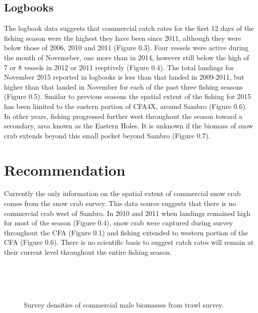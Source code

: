 \documentclass[paper=a4, fontsize=11pt]{article}
\newcommand{\D}{.}
\numberwithin{equation}{section}
\numberwithin{figure}{section}
\numberwithin{table}{section}
\begin{document}
\subsection{Logbooks}
The logbook data suggests that commercial catch rates for the first 12 days of the fishing season were the highest they have been since 2011, although they were below those of 2006, 2010 and 2011 (Figure 0.3). Four vessels were active during the month of Novemeber, one more than in 2014, however still below the high of 7 or 8 vessels in 2012 or 2011 resptively (Figure 0.4). The total landings for November 2015 reported in logbooks is less than that landed in 2009-2011, but higher than that landed in November for each of the past three fishing seasons (Figure 0.5). Smiilar to previous seasons the spatial extent of the fishing for 2015 has been limited to the eastern portion of CFA4X, around Sambro (Figure 0.6). In other years, fishing progressed further west throughout the season toward a secondary, area known as the Eastern Holes. It is unknown if the biomass of snow crab extends beyond this small pocket beyond Sambro (Figure 0.7).\\ 

\section{Recommendation}
 Currently the only information on the spatial extent of commercial snow crab comes from the snow crab survey. This data source suggests that there is no commercial crab west of Sambro. In 2010 and 2011 when landings remained high for most of the season (Figure 0.4), snow crab were captured during survey throughout the CFA (Figure 0.1) and fishing extended to western portion of the CFA (Figure 0.6). There is no scientific basis to suggest catch rates will remain at their current level throughout the entire fishing season.



\begin{figure}
   \centering
  	\\
  	\\
  	\\
	\caption{Survey densities of commercial male biomasses from trawl survey.}

\end{figure}
\clearpage
\end{document}
